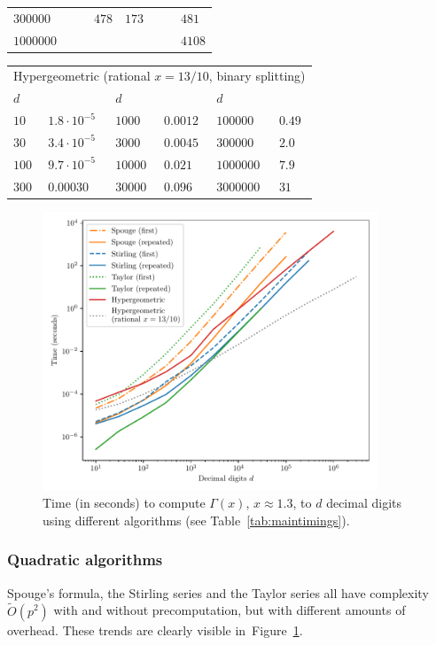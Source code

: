 \documentclass[reqno]{amsart}
\newcommand{\bigOtilde}{\widetilde O}
\theoremstyle{definition}
\begin{document}
\begin{table}
\begin{tabular}{l l l l l l l l}
 $300000$ &  &  &  $478$   &  $173$                      &    &            &  $481$        \\
 $1000000$ &  &  &         &                           &    &            &  $4108$         \\ [1ex]
\end{tabular}
\setlength{\tabcolsep}{8pt}
\begin{tabular}{l l l l l l}
 \multicolumn{6}{c}{Hypergeometric (rational $x = 13/10$, binary splitting)} \\
 $d$ &  & $d$ & & $d$ & \\
 \hline
 $10$  & $1.8 \cdot 10^{-5}$  & $1000$  & $0.0012$ &  $100000$ & $0.49$ \\
 $30$  & $3.4 \cdot 10^{-5}$  & $3000$  & $0.0045$ &  $300000$ &  $2.0$ \\
 $100$ & $9.7 \cdot 10^{-5}$  & $10000$ & $0.021$  &  $1000000$ & $7.9$ \\
 $300$ & $0.00030$            & $30000$ & $0.096$  &  $3000000$ & $31$
\end{tabular}
\end{table}


\begin{figure}
\caption{Time (in seconds) to compute $\Gamma(x)$, $x \approx 1.3$, to $d$ decimal digits using different algorithms (see Table~\ref{tab:maintimings}). \label{fig:gammatime}}
\includegraphics[width=10cm]{gammatime}
\end{figure}

\subsubsection{Quadratic algorithms}

Spouge's formula, the Stirling series and the Taylor series
all have complexity $\bigOtilde(p^2)$
with and without precomputation, but with
different amounts of overhead.
These trends are clearly visible in~Figure~\ref{fig:gammatime}.
\end{document}
